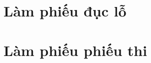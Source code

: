 \documentclass[12pt]{article}
\newenvironment{khung}{%
  \def\FrameCommand{\fcolorbox{black}{shadecolor}}%
  \MakeFramed {\advance\hsize-\width \FrameRestore}%
  }%
{\endMakeFramed}
\def\dkhung{
\begin{khung}
\noindent\theverbbox[t]
\end{khung}
}
\begin{document}
\begin{verbbox} 
\setcounter{page}{1}
\inloigiai
\begin{enumerate}[]
\foreachproblem[bttracnghiem]{\item\thisproblem}
\end{enumerate}
\end{verbbox} 
\dkhung
 
 
\setcounter{page}{1}
\inloigiai
\begin{enumerate}[]
\foreachproblem[bttracnghiem]{\item\thisproblem}
\end{enumerate}


\newpage
\section{Làm phiếu đục lỗ}
\begin{verbbox} 
 \setcounter{page}{1}
\inphieuduclo
\lamphieuthi
\begin{center}
\begin{multicols}{3}
\begin{enumerate}[\causo]
\foreachproblem[bttracnghiem]{\item\thisproblem}
\end{enumerate}
\end{multicols}
\end{center}
\end{verbbox} 
\dkhung
 
 
\setcounter{page}{1}
\inphieuduclo
\lamphieuthi
\begin{center}
\begin{multicols}{3}
\begin{enumerate}[\causo]
\foreachproblem[bttracnghiem]{\item\thisproblem}
\end{enumerate}
\end{multicols}
\end{center}

\newpage
\section{Làm phiếu phiếu thi}
\begin{verbbox} 
 \inphieuthi
\lamphieuthi
\begin{multicols}{3}
\begin{enumerate}[\causo]
\foreachproblem[bttracnghiem]{\item\thisproblem}
\end{enumerate}
\end{multicols}
\end{verbbox} 
\dkhung
 
 
\inphieuthi
\lamphieuthi
\begin{multicols}{3}
\begin{enumerate}[\causo]
\foreachproblem[bttracnghiem]{\item\thisproblem}
\end{enumerate}
\end{multicols}


% 
\end{document}
